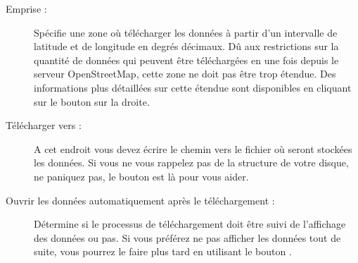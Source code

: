 \begin{description}
\item[Emprise :] Spécifie une zone où télécharger les données à partir d'un intervalle de latitude et de longitude en degrés décimaux. Dû aux restrictions sur la quantité de données qui peuvent être téléchargées en une fois depuis le serveur OpenStreetMap, cette zone ne doit pas être trop étendue. Des informations plus détaillées sur cette étendue sont disponibles en cliquant sur le bouton  sur la droite.
\item[Télécharger vers :] A cet endroit vous devez écrire le chemin vers le fichier où seront stockées les données. Si vous ne vous rappelez pas de la structure de votre disque, ne paniquez pas, le bouton  est là pour vous aider.
\item[Ouvrir les données automatiquement après le téléchargement :] Détermine si le processus de téléchargement doit être suivi de l'affichage des données ou pas. Si vous préférez ne pas afficher les données tout de suite, vous pourrez le faire plus tard en utilisant le bouton .

\end{description}
